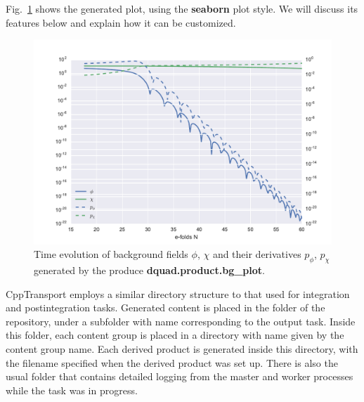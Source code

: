 \documentclass[11pt,a4paper]{article}
\renewcommand{\texttt}[1]{{\ttfamily\fontseries{l}\selectfont{#1}}}
\newcommand{\repoobject}[1]{{\ttfamily\bfseries\small #1}}
\newcommand{\packagefont}{\sffamily}
\newcommand{\CppTransport}{{\packagefont CppTransport}}
\newcommand{\file}[1]{\texttt{{#1}}}
\newcommand{\option}[1]{{\ttfamily\bfseries\small #1}}
\begin{document}
Fig.~\ref{fig:background-plot} shows the generated plot, using the
\option{seaborn} plot style.
We will discuss its features below and explain how it can be customized.
\begin{figure}
	\begin{center}
		\includegraphics[scale=0.75]{Outputs/background}	
	\end{center}
	\caption{\label{fig:background-plot}Time evolution of background fields $\phi$, $\chi$ and their
	derivatives $p_\phi$, $p_\chi$ generated by the produce
	\repoobject{dquad.product.bg\_plot}.}
\end{figure}

{\CppTransport} employs a similar directory structure to that
used for integration and postintegration tasks.
Generated content is placed in the \file{output} folder of the repository,
under a subfolder with name corresponding to the output task.
Inside this folder, each content group
is placed in a directory with name given by the content group name.
Each derived product is generated inside this directory, with the filename
specified when the derived product was set up.
There is also the usual \file{logs} folder that contains detailed logging
from the master and worker processes while the task was in progress.
\end{document}
